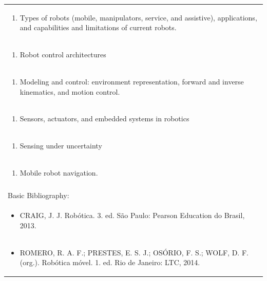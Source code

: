 \documentclass[11pt]{article}
\begin{document}
\begin{center}
\begin{longtable}{|p{4cm}|p{4cm}|p{4cm}|p{4cm}|}
\multicolumn{4}{|p{\dimexpr 16cm + 6\tabcolsep\relax}|}{\begin{enumerate}[start=2]\item Types of robots (mobile, manipulators, service, and assistive), applications, and capabilities and limitations of current robots.\end{enumerate}}\\
\multicolumn{4}{|p{\dimexpr 16cm + 6\tabcolsep\relax}|}{\begin{enumerate}[start=3]\item Robot control architectures\end{enumerate}}\\
\multicolumn{4}{|p{\dimexpr 16cm + 6\tabcolsep\relax}|}{\begin{enumerate}[start=4]\item Modeling and control: environment representation, forward and inverse kinematics, and motion control.\end{enumerate}}\\
\multicolumn{4}{|p{\dimexpr 16cm + 6\tabcolsep\relax}|}{\begin{enumerate}[start=5]\item Sensors, actuators, and embedded systems in robotics\end{enumerate}}\\
\multicolumn{4}{|p{\dimexpr 16cm + 6\tabcolsep\relax}|}{\begin{enumerate}[start=6]\item Sensing under uncertainty\end{enumerate}}\\
\multicolumn{4}{|p{\dimexpr 16cm + 6\tabcolsep\relax}|}{\begin{enumerate}[start=7]\item Mobile robot navigation.\end{enumerate}}\\
\multicolumn{4}{|p{\dimexpr 16cm + 6\tabcolsep\relax}|}{}\\
\hline
\multicolumn{4}{|p{16cm}|}{Basic Bibliography:}\\*
\multicolumn{4}{|p{\dimexpr 16cm + 6\tabcolsep\relax}|}{\begin{itemize}\item CRAIG, J. J. Robótica. 3. ed. São Paulo: Pearson Education do Brasil, 2013.\end{itemize}}\\
\multicolumn{4}{|p{\dimexpr 16cm + 6\tabcolsep\relax}|}{\begin{itemize}\item ROMERO, R. A. F.; PRESTES, E. S. J.; OSÓRIO, F. S.; WOLF, D. F. (org.). Robótica móvel. 1. ed. Rio de Janeiro: LTC, 2014.\end{itemize}}\\

\end{longtable}
\end{center}
\end{document}
